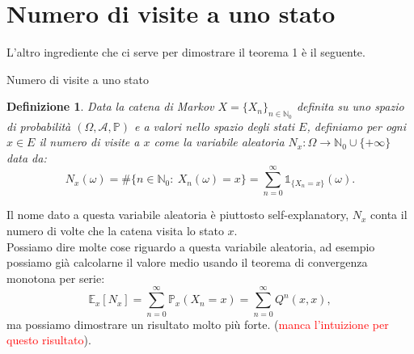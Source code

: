 \documentclass[11pt]{book}
\theoremstyle{Definizione}
\newtheorem*{mydef}{Definizione}
\theoremstyle{TeoremaProposizioneLemmaCorollario}
\theoremstyle{OsservazioneNota}
\newcommand{\N}{\mathbb{N}}
\renewcommand{\P}{\mathbb{P}}
\newcommand{\E}{\mathbb{E}}
\newcommand{\uno}[1]{\mathds{1}_{#1}}
\begin{document}
\section{Numero di visite a uno stato}
L'altro ingrediente che ci serve per dimostrare il teorema 1 è il seguente.
\begin{boxdef}{Numero di visite a uno stato}
\begin{mydef}
Data la catena di Markov $X = \{X_n\}_{n \in \N_0}$ definita su uno spazio di probabilità $(\Omega,\mathcal{A},\P)$ e a valori nello spazio degli stati $E$, definiamo per ogni $x\in E$ il numero di visite a $x$ come la variabile aleatoria $N_x:\Omega \longrightarrow \N_0 \cup \{+\infty\}$ data da:
$$
N_x(\omega) = \#\{n\in \N_0:\ X_n(\omega) = x\} = \sum_{n = 0}^\infty \uno{\{X_n = x\}}(\omega).
$$
\end{mydef}
\end{boxdef}
\noindent
Il nome dato a questa variabile aleatoria è piuttosto self-explanatory, $N_x$ conta il numero di volte che la catena visita lo stato $x$.\\
Possiamo dire molte cose riguardo a questa variabile aleatoria, ad esempio possiamo già calcolarne il valore medio usando il teorema di convergenza monotona per serie:
$$
\E_x[N_x] =  \sum_{n = 0}^\infty \P_x(X_n = x) = \sum_{n = 0}^\infty Q^n(x,x),
$$
ma possiamo dimostrare un risultato molto più forte. (\textcolor{red}{manca l'intuizione per questo risultato}).
\end{document}
